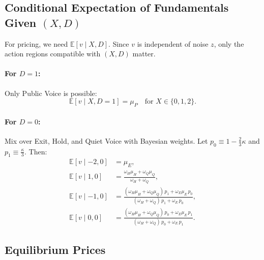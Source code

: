 \documentclass[11pt]{article}
\newcommand{\E}{\mathbb{E}}
\newcommand{\1}{\mathbf{1}}
\begin{document}
%
\subsection{Conditional Expectation of Fundamentals Given \texorpdfstring{$(X,D)$}{(X,D)}}
%

For pricing, we need $\E[v \mid X, D]$. Since $v$ is independent of noise $z$, only the action regions compatible with $(X, D)$ matter.

\paragraph{For $D=1$:} Only Public Voice is possible:
\[
\E[v \mid X, D=1] = \mu_P \quad \text{for } X \in \{0, 1, 2\}.
\]

\paragraph{For $D=0$:} Mix over Exit, Hold, and Quiet Voice with Bayesian weights. Let $p_0 \equiv 1 - \frac{2}{3}\kappa$ and $p_1 \equiv \frac{\kappa}{3}$. Then:
\begin{align*}
\E[v \mid -2, 0] &= \mu_E, \\
\E[v \mid 1, 0] &= \frac{\omega_H \mu_H + \omega_Q \mu_Q}{\omega_H + \omega_Q}, \\
\E[v \mid -1, 0] &= \frac{(\omega_H \mu_H + \omega_Q \mu_Q) \, p_1 + \omega_E \mu_E \, p_0}{(\omega_H + \omega_Q) \, p_1 + \omega_E \, p_0}, \\
\E[v \mid 0, 0] &= \frac{(\omega_H \mu_H + \omega_Q \mu_Q) \, p_0 + \omega_E \mu_E \, p_1}{(\omega_H + \omega_Q) \, p_0 + \omega_E \, p_1}.
\end{align*}

%
\subsection{Equilibrium Prices}
\label{sec:prices}
\end{document}
